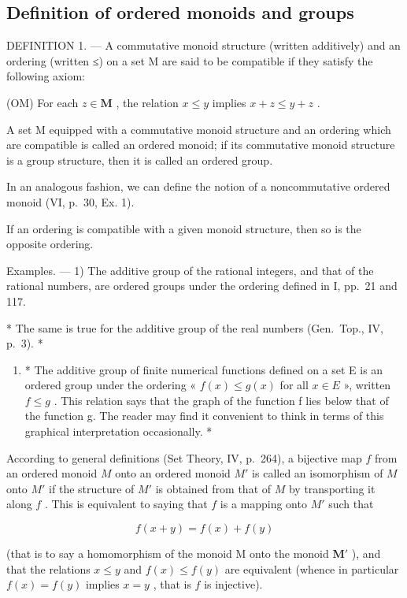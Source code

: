 \subsection{Definition of ordered monoids and groups}

DEFINITION 1. --- A commutative monoid structure (written additively) and an ordering (written ≤) on a set M are said to be compatible if they satisfy the following axiom:

(OM) For each \(z \in \mathbf{M}\) , the relation \(x \leqslant y\) implies \(x + z \leqslant y + z\) .

A set M equipped with a commutative monoid structure and an ordering which are compatible is called an ordered monoid; if its commutative monoid structure is a group structure, then it is called an ordered group.

In an analogous fashion, we can define the notion of a noncommutative ordered monoid (VI, p.~30, Ex. 1).

If an ordering is compatible with a given monoid structure, then so is the opposite ordering.

Examples. --- 1) The additive group of the rational integers, and that of the rational numbers, are ordered groups under the ordering defined in I, pp.~21 and 117.

* The same is true for the additive group of the real numbers (Gen.~Top., IV, p.~3). *

\begin{enumerate}
\def\labelenumi{\arabic{enumi})}
\setcounter{enumi}{1}
\tightlist
\item
  * The additive group of finite numerical functions defined on a set E is an ordered group under the ordering « \(f(x) \leq g(x)\) for all \(x \in E\) », written \(f \leq g\) . This relation says that the graph of the function f lies below that of the function g. The reader may find it convenient to think in terms of this graphical interpretation occasionally. *
\end{enumerate}

According to general definitions (Set Theory, IV, p.~264), a bijective map \(f\) from an ordered monoid \(M\) onto an ordered monoid \(M'\) is called an isomorphism of \(M\) onto \(M'\) if the structure of \(M'\) is obtained from that of \(M\) by transporting it along \(f\) . This is equivalent to saying that \(f\) is a mapping onto \(M'\) such that

\[
f (x + y) = f (x) + f (y)
\]

(that is to say a homomorphism of the monoid M onto the monoid \(\mathbf{M}'\) ), and that the relations \(x \leqslant y\) and \(f(x) \leqslant f(y)\) are equivalent (whence in particular \(f(x) = f(y)\) implies \(x = y\) , that is \(f\) is injective).

